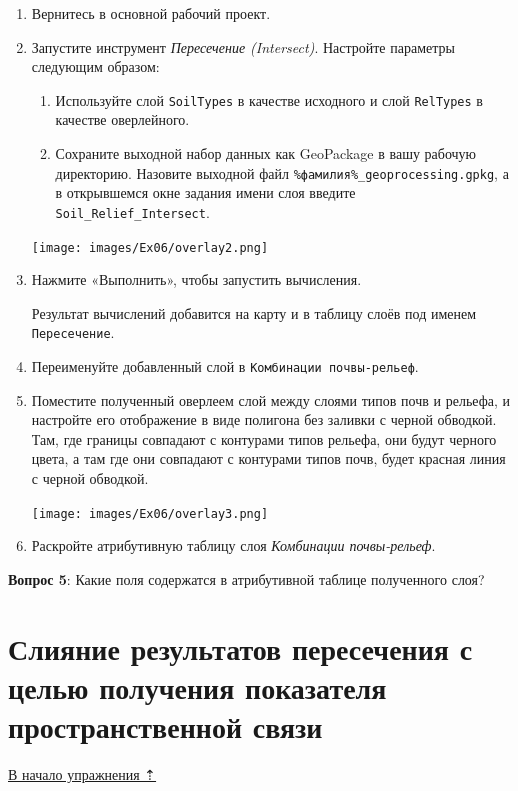 \documentclass[
  12pt,
]{book}
\providecommand{\tightlist}{%
  \setlength{\itemsep}{0pt}\setlength{\parskip}{0pt}}
\begin{document}
\begin{enumerate}
\def\labelenumi{\arabic{enumi}.}
\item
  Вернитесь в основной рабочий проект.
\item
  Запустите инструмент \emph{Пересечение (Intersect)}. Настройте параметры следующим образом:

  \begin{enumerate}
  \def\labelenumii{\arabic{enumii}.}
  \tightlist
  \item
    Используйте слой \texttt{SoilTypes} в качестве исходного и слой \texttt{RelTypes} в качестве оверлейного.\\
  \item
    Сохраните выходной набор данных как GeoPackage в вашу рабочую директорию. Назовите выходной файл \texttt{\%фамилия\%\_geoprocessing.gpkg}, а в открывшемся окне задания имени слоя введите \texttt{Soil\_Relief\_Intersect}.
  \end{enumerate}

  \texttt{[image: images/Ex06/overlay2.png]}
\item
  Нажмите «Выполнить», чтобы запустить вычисления.

  Результат вычислений добавится на карту и в таблицу слоёв под именем \texttt{Пересечение}.
\item
  Переименуйте добавленный слой в \texttt{Комбинации\ почвы-рельеф}.
\item
  Поместите полученный оверлеем слой между слоями типов почв и рельефа, и настройте его отображение в виде полигона без заливки с черной обводкой. Там, где границы совпадают с контурами типов рельефа, они будут черного цвета, а там где они совпадают с контурами типов почв, будет красная линия с черной обводкой.

  \texttt{[image: images/Ex06/overlay3.png]}
\item
  Раскройте атрибутивную таблицу слоя \emph{Комбинации почвы-рельеф}.
\end{enumerate}

\textbf{Вопрос 5}: Какие поля содержатся в атрибутивной таблице полученного слоя?

\hypertarget{overlay-merge}{%
\section{Слияние результатов пересечения с целью получения показателя пространственной связи}\label{overlay-merge}}

\protect\hyperlink{overlay}{В начало упражнения ⇡}
\end{document}
